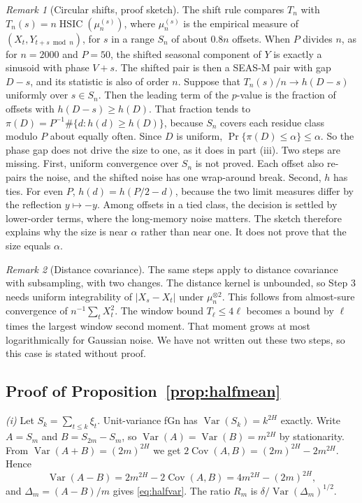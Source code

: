 \documentclass[11pt]{article}
\theoremstyle{remark}
\newtheorem{remark}{Remark}
\newcommand{\HSIC}{\operatorname{HSIC}}
\newcommand{\Cov}{\operatorname{Cov}}
\newcommand{\Var}{\operatorname{Var}}
\begin{document}
\begin{remark}[Circular shifts, proof sketch]\label{rem:shift}
The shift rule compares $T_n$ with $T_n(s)=n\HSIC(\mu_n^{(s)})$, where $\mu_n^{(s)}$ is the empirical measure of $(X_t,Y_{t+s\bmod n})$, for $s$ in a range $S_n$ of about $0.8n$ offsets. When $P$ divides $n$, as for $n=2000$ and $P=50$, the shifted seasonal component of $Y$ is exactly a sinusoid with phase $V+s$. The shifted pair is then a SEAS-M pair with gap $D-s$, and its statistic is also of order $n$. Suppose that $T_n(s)/n\to h(D-s)$ uniformly over $s\in S_n$. Then the leading term of the $p$-value is the fraction of offsets with $h(D-s)\ge h(D)$. That fraction tends to $\pi(D)=P^{-1}\#\{d:h(d)\ge h(D)\}$, because $S_n$ covers each residue class modulo $P$ about equally often. Since $D$ is uniform, $\Pr\{\pi(D)\le\alpha\}\le\alpha$. So the phase gap does not drive the size to one, as it does in part (iii). Two steps are missing. First, uniform convergence over $S_n$ is not proved. Each offset also re-pairs the noise, and the shifted noise has one wrap-around break. Second, $h$ has ties. For even $P$, $h(d)=h(P/2-d)$, because the two limit measures differ by the reflection $y\mapsto-y$. Among offsets in a tied class, the decision is settled by lower-order terms, where the long-memory noise matters. The sketch therefore explains why the size is near $\alpha$ rather than near one. It does not prove that the size equals $\alpha$.
\end{remark}

\begin{remark}[Distance covariance]
The same steps apply to distance covariance with subsampling, with two changes. The distance kernel is unbounded, so Step 3 needs uniform integrability of $|X_s-X_t|$ under $\mu_n^{\otimes2}$. This follows from almost-sure convergence of $n^{-1}\sum_tX_t^2$. The window bound $T_\ell\le4\ell$ becomes a bound by $\ell$ times the largest window second moment. That moment grows at most logarithmically for Gaussian noise. We have not written out these two steps, so this case is stated without proof.
\end{remark}

\subsection{Proof of Proposition~\ref{prop:halfmean}}
\emph{(i)} Let $S_k=\sum_{t\le k}\xi_t$. Unit-variance fGn has $\Var(S_k)=k^{2H}$ exactly. Write $A=S_m$ and $B=S_{2m}-S_m$, so $\Var(A)=\Var(B)=m^{2H}$ by stationarity. From $\Var(A+B)=(2m)^{2H}$ we get $2\Cov(A,B)=(2m)^{2H}-2m^{2H}$. Hence
\[
\Var(A-B)=2m^{2H}-2\Cov(A,B)=4m^{2H}-(2m)^{2H},
\]
and $\Delta_m=(A-B)/m$ gives \eqref{eq:halfvar}. The ratio $R_m$ is $\delta/\Var(\Delta_m)^{1/2}$.
\end{document}
